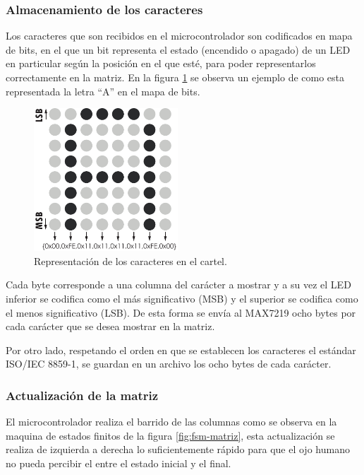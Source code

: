 \subsubsection{Almacenamiento de los caracteres}

Los caracteres que son recibidos en el microcontrolador son codificados en mapa de bits, en el que un bit representa el estado (encendido o apagado) de un LED en particular según la posición en el que esté, para poder representarlos correctamente en la matriz. En la figura \ref{fig:repAscii} se observa un ejemplo de como esta representada la letra \enquote{A} en el mapa de bits.

\begin{figure}[h!]
    \centering
    \includegraphics[width=0.48\textwidth]{imagenes/codificacionAscii.pdf}
    \caption{Representación de los caracteres en el cartel.}
    \label{fig:repAscii}
\end{figure}

Cada byte corresponde a una columna del carácter a mostrar y a su vez el LED inferior se codifica como el más significativo (MSB) y el superior se codifica como el menos significativo (LSB). De esta forma se envía al MAX7219 ocho bytes por cada carácter que se desea mostrar en la matriz.

Por otro lado, respetando el orden en que se establecen los caracteres el estándar ISO/IEC 8859-1, se guardan en un archivo los ocho bytes de cada carácter.

\subsubsection{Actualización de la matriz}

El microcontrolador realiza el barrido de las columnas como se observa en la maquina de estados finitos de la figura \ref{fig:fsm-matriz}, esta actualización se realiza de izquierda a derecha lo suficientemente rápido para que el ojo humano no pueda percibir el entre el estado inicial y el final. 

